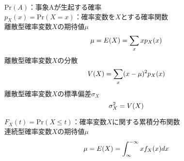 \noindent$\mathrm{Pr}(A)$：事象Aが生起する確率 \\
$p_X(x)=\mathrm{Pr}(X=x)$：確率変数を$X$とする確率関数 \\

\noindent 離散型確率変数$X$の期待値$\mu$ \\
\begin{equation*}
  \mu=E(X)=\sum_{x}xp_X(x) \\
\end{equation*}
離散型確率変数$X$の分散 \\
\begin{equation*}
  V(X)=\sum_x(x-\mu)^2p_X(x) \\
\end{equation*}
離散型確率変数$X$の標準偏差$\sigma_X$ \\
\begin{equation*}
  \sigma^2_X=V(X) \\
\end{equation*}

\noindent $F_X(t)=\mathrm{Pr}(X\le t)$：確率変数$X$に関する累積分布関数 \\

\noindent 連続型確率変数$X$の期待値$\mu$ \\
\begin{equation*}
  \mu=E(X)=\int_{\infty}^{-\infty}xf_X(x)dx \\
\end{equation*}